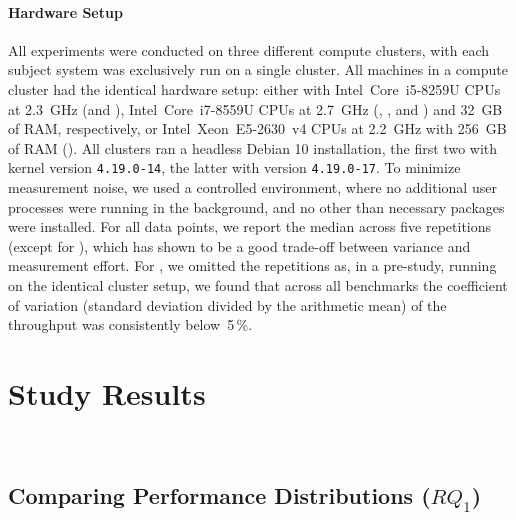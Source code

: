 \paragraph{Hardware Setup}
All experiments were conducted on three different compute clusters, with each subject system was exclusively run on a single cluster. All machines in a compute cluster had the identical hardware setup: either with Intel~Core~i5-8259U CPUs at 2.3~GHz (\jumper and \kanzi),  Intel~Core~i7-8559U CPUs at 2.7~GHz (\dconvert, \batik, and \jadx) and 32~GB of RAM, respectively, or Intel~Xeon~E5-2630~v4 CPUs at 2.2~GHz with 256~GB of RAM (\htwo). All clusters ran a headless Debian 10 installation, the first two with kernel version \mbox{\texttt{4.19.0-14}}, the latter with version \mbox{\texttt{4.19.0-17}}. 
To minimize measurement noise, we used a controlled environment, where no additional user processes were running in the background, and no other than necessary packages were installed.	For all data points, we report the median across five repetitions (except for \htwo), which has shown to be a good trade-off between variance and measurement effort. For \htwo, we omitted the repetitions as, in a pre-study, running on the identical cluster setup, we found that across all benchmarks the coefficient of variation (standard deviation divided by the arithmetic mean) of the throughput was consistently below~5\,\%.

\section{Study Results}~\label{sec:results}
\subsection{Comparing Performance Distributions ($RQ_1$)}\label{sec:rq1}
